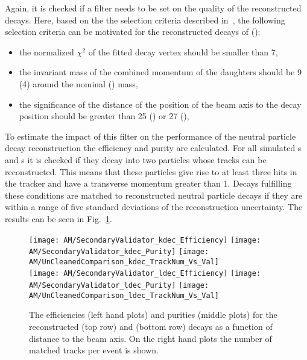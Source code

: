Again, it is checked if a filter needs to be set on the quality of the reconstructed decays. Here, based on the the selection criteria described in~\cite{v0paper}, the following selection criteria can be motivated for the reconstructed decays of \PKzS{} (\PgL{}):
\begin{itemize}
    \item the normalized $\chi^{2}$ of the fitted decay vertex should be smaller than 7,
    \item the invariant mass of the combined momentum of the daughters should be 9\MeV{} (4\MeV{}) around the nominal \PKzS{} (\PgL{}) mass,
    \item the significance of the distance of the position of the beam axis to the decay position should be greater than 25 (\PKzS{}) or 27 (\PgL{}),
\end{itemize}
To estimate the impact of this filter on the performance of the neutral particle decay reconstruction the efficiency and purity are calculated. For all simulated \PKzS{}s and \PgL{}s it is checked if they decay into two particles whose tracks can be reconstructed. This means that these particles give rise to at least three hits in the tracker and have a transverse momentum greater than 1\GeV. Decays fulfilling these conditions are matched to reconstructed neutral particle decays if they are within a range of five standard deviations of the reconstruction uncertainty. The results can be seen in Fig.~\ref{plot:AMWFSVdecEffAndPurDC}.

\begin{figure}[Ht]
    \centering
    \texttt{[image: AM/SecondaryValidator\_kdec\_Efficiency]}
    \texttt{[image: AM/SecondaryValidator\_kdec\_Purity]}
    \texttt{[image: AM/UnCleanedComparison\_kdec\_TrackNum\_Vs\_Val]}
    \\
    \texttt{[image: AM/SecondaryValidator\_ldec\_Efficiency]}
    \texttt{[image: AM/SecondaryValidator\_ldec\_Purity]}
    \texttt{[image: AM/UnCleanedComparison\_ldec\_TrackNum\_Vs\_Val]}
    \caption[Efficiency and purity of the reconstructed \PKzS{} and \PgL{} decays as a function of distance to the beam axis and number of matched tracks]{The efficiencies (left hand plots) and purities (middle plots) for the reconstructed \PKzS{} (top row) and \PgL{} (bottom row) decays as a function of distance to the beam axis. On the right hand plots the number of matched tracks per event is shown. \label{plot:AMWFSVdecEffAndPurDC}}
\end{figure}

